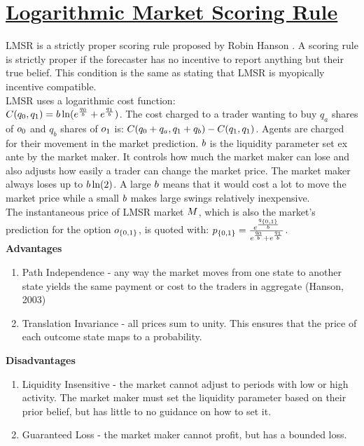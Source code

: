 \section{\href{http://mason.gmu.edu/~rhanson/mktscore.pdf}{Logarithmic Market Scoring Rule}}
LMSR is a strictly proper scoring rule proposed by Robin Hanson \cite{Hanson2003}. A scoring rule is strictly proper if the forecaster has no incentive to report anything but their true belief. This condition is the same as stating that LMSR is myopically incentive compatible.\\ 

LMSR uses a logarithmic cost function: \\
$C({q_0},{q_1}) = b\ln(e^{\frac{{q_0}}{b}} + e^{\frac{{q_1}}{b}})$. The cost charged to a trader wanting to buy $q_a$ shares of $o_0$ and $q_b$ shares of $o_1$ is: $C({q_0} + q_a, {q_1} + q_b) - C(q_1,{q_1})$. Agents are charged for their movement in the market prediction. $b$ is the liquidity parameter set ex ante by the market maker. It controls how much the market maker can lose and also adjusts how easily a trader can change the market price. The market maker always loses up to $b\ln(2)$. A large $b$ means that it would cost a lot to move the market price while a small $b$ makes large swings relatively inexpensive.\\

The instantaneous price of LMSR market $M$, which is also the market's prediction for the option $o_{\{0,1\}}$, is quoted with: $p_{\{0,1\}} = \frac{e^{\frac{q_{\{0,1\}}}{b}}}{e^{\frac{{q_0}}{b}} + e^{\frac{{q_1}}{b}}}$. \\

\textbf{Advantages}\\
\begin{enumerate}
\item{Path Independence - any way the market moves from one state to another state yields the same payment or cost to the traders in aggregate (Hanson, 2003)}
\item{Translation Invariance - all prices sum to unity. This ensures that the price of each outcome state maps to a probability.}
\end{enumerate}

\textbf{Disadvantages} \\
\begin{enumerate}
\item{Liquidity Insensitive - the market cannot adjust to periods with low or high activity. The market maker must set the liquidity parameter based on their prior belief, but has little to no guidance on how to set it. \cite{Othman:2013:PLA:2509413.2509414}}
\item{Guaranteed Loss - the market maker cannot profit, but has a bounded loss.}
\end{enumerate}

